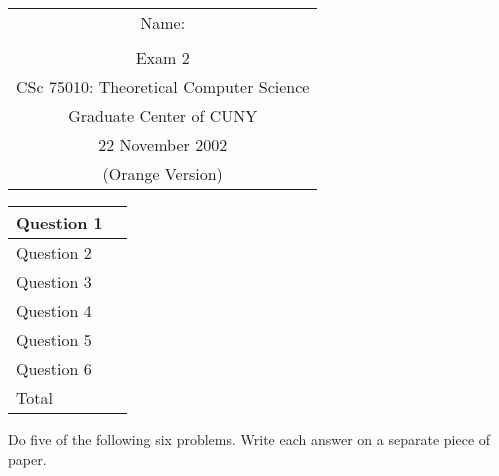 \documentclass[11pt]{article}
\begin{document}
{\bf
\begin{tabular}{c}
	Name: \underline{\hspace{2.5in}}\\ \\
	{\large Exam 2}\\
        	CSc 75010: Theoretical Computer Science\\
        	Graduate Center of CUNY\\
	22 November 2002\\
        	(Orange Version)
\end{tabular}
}
\hfill
\begin{tabular}{|l|c|}
\hline
Question 1 & \mbox{\hspace{.5in}}\\
\hline        	
Question 2 & \\
\hline
Question 3 & \\
\hline
        	Question 4 & \\
\hline
        	Question 5 & \\
\hline
        	Question 6 & \\
\hline\hline
         Total & \\
\hline
\end{tabular}

Do five of the following six problems.  Write each answer on a separate
piece of paper.
\end{document}
